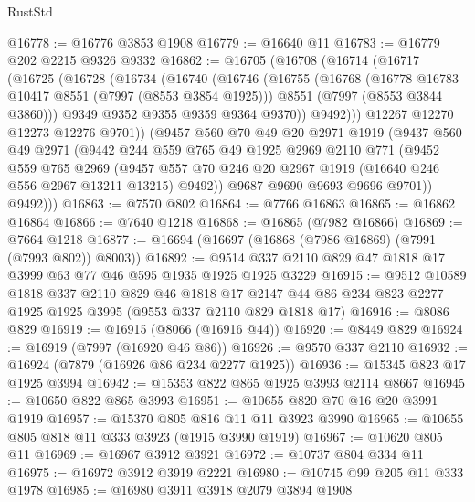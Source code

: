 \begin{lexlean}{RustStd}
\begin{coremodule}
@16778 := @16776 @3853 @1908
@16779 := @16640 @11
@16783 := @16779 @202 @2215 @9326 @9332
@16862 := @16705
    (@16708
      (@16714
        (@16717
          (@16725
            (@16728
              (@16734
                (@16740
                  (@16746
                    (@16755
                      (@16768
                        (@16778 @16783 @10417 @8551 (@7997 (@8553 @3854 @1925)))
                        @8551
                        (@7997 (@8553 @3844 @3860)))
                      @9349
                      @9352
                      @9355
                      @9359
                      @9364
                      @9370))
                  @9492)))
            @12267
            @12270
            @12273
            @12276
            @9701))
        (@9457
          @560
          @70
          @49
          @20
          @2971
          @1919
          (@9437
            @560
            @49
            @2971
            (@9442
              @244
              @559
              @765
              @49
              @1925
              @2969
              @2110
              @771
              (@9452
                @559
                @765
                @2969
                (@9457 @557 @70 @246 @20 @2967 @1919 (@16640 @246 @556 @2967 @13211 @13215) @9492))
              @9687
              @9690
              @9693
              @9696
              @9701))
          @9492)))
@16863 := @7570 @802
@16864 := @7766 @16863
@16865 := @16862 @16864
@16866 := @7640 @1218
@16868 := @16865 (@7982 @16866)
@16869 := @7664 @1218
@16877 := @16694 (@16697 (@16868 (@7986 @16869) (@7991 (@7993 @802)) @8003))
@16892 := @9514 @337 @2110 @829 @47 @1818 @17 @3999 @63 @77 @46 @595 @1935 @1925 @1925 @3229
@16915 := @9512
    @10589
    @1818
    @337
    @2110
    @829
    @46
    @1818
    @17
    @2147
    @44
    @86
    @234
    @823
    @2277
    @1925
    @1925
    @3995
    (@9553 @337 @2110 @829 @1818 @17)
@16916 := @8086 @829
@16919 := @16915 (@8066 (@16916 @44))
@16920 := @8449 @829
@16924 := @16919 (@7997 (@16920 @46 @86))
@16926 := @9570 @337 @2110
@16932 := @16924 (@7879 (@16926 @86 @234 @2277 @1925))
@16936 := @15345 @823 @17 @1925 @3994
@16942 := @15353 @822 @865 @1925 @3993 @2114 @8667
@16945 := @10650 @822 @865 @3993
@16951 := @10655 @820 @70 @16 @20 @3991 @1919
@16957 := @15370 @805 @816 @11 @11 @3923 @3990
@16965 := @10655 @805 @818 @11 @333 @3923 (@1915 @3990 @1919)
@16967 := @10620 @805 @11
@16969 := @16967 @3912 @3921
@16972 := @10737 @804 @334 @11
@16975 := @16972 @3912 @3919 @2221
@16980 := @10745 @99 @205 @11 @333 @1978
@16985 := @16980 @3911 @3918 @2079 @3894 @1908

\end{coremodule}
\end{lexlean}
